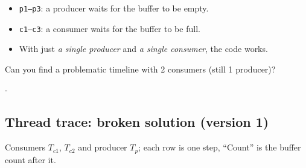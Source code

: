 \documentclass[11pt,a4paper]{article}
\makeatletter
\newcommand{\keepspace}[1]{\par\penalty-100\begingroup
  \setlength{\dimen@}{#1}\dimen@ii\pagegoal\advance\dimen@ii-\pagetotal
  \ifdim\dimen@>\dimen@ii\ifdim\dimen@ii>\z@\vfil\fi\break\fi\endgroup}
\newcommand{\Tc}[1]{\(T_{c#1}\)}
\newcommand{\Tp}{\(T_p\)}
\makeatother
\begin{document}
\begin{itemize}
  \item \texttt{p1--p3}: a producer waits for the buffer to be empty.
  \item \texttt{c1--c3}: a consumer waits for the buffer to be full.
  \item With just \emph{a single producer} and \emph{a single consumer},
        the code works.
\end{itemize}

\begin{quizbox}
Can you find a problematic timeline with 2 consumers (still 1 producer)?
\end{quizbox}

\keepspace{26\baselineskip}
\subsection{Thread trace: broken solution (version 1)}

Consumers \Tc1, \Tc2 and producer \Tp; each row is one step, ``Count'' is
the buffer count after it.
\end{document}
